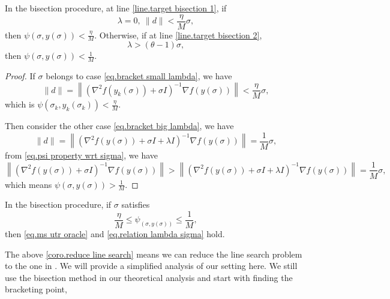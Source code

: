 \documentclass{article}
\begin{document}
\begin{lemma}
    \label{lem.reduce line search}
    In the bisection procedure, at line \ref{line.target bisection 1}, if  
    \begin{equation}
    \label{eq.bracket small lambda}
    \lambda = 0, \ \|d\|<\frac{\eta}{M}\sigma,
    \end{equation}
then $\psi(\sigma,y(\sigma))<\frac{\eta}{M}$.  Otherwise, if at line \ref{line.target bisection 2},
\begin{equation}
    \label{eq.bracket big lambda}
    \lambda > (\theta-1)\sigma,
\end{equation}
then $\psi(\sigma,y(\sigma))<\frac{1}{M}.$
\end{lemma}
\begin{proof}
If $\sigma$ belongs to case \eqref{eq.bracket small lambda}, we have 
\begin{equation*}
    \|d\| = \left \|\left(\nabla^2 f(y_k(\sigma))+\sigma I\right)^{-1}\nabla f(y(\sigma))\right\|<\frac{\eta}{M}\sigma,
\end{equation*}
which is $\psi(\sigma_k,y_k(\sigma_k))<\frac{\eta}{M}$.

Then consider the other case \eqref{eq.bracket big lambda}, we have
\begin{equation*}
    \|d\| = \left \|\left(\nabla^2 f(y(\sigma))+\sigma I+\lambda I\right)^{-1}\nabla f(y(\sigma))\right\|=\frac{1}{M}\sigma,
\end{equation*}
from \eqref{eq.psi property wrt sigma}, we have 
\begin{equation*}
     \left \|\left(\nabla^2 f(y(\sigma))+\sigma I\right)^{-1}\nabla f(y(\sigma))\right\|>\left \|\left(\nabla^2 f(y(\sigma))+\sigma I+\lambda I\right)^{-1}\nabla f(y(\sigma))\right\|=\frac{1}{M}\sigma,
\end{equation*}
which means $\psi \left(\sigma,y(\sigma)\right)>\frac{1}{M}$.
\end{proof}
\begin{corollary}
    \label{coro.reduce line search}
    In the bisection procedure, if $\sigma$ satisfies
    \begin{equation}
        \label{eq.reduce line search interval}
        \frac{\eta}{M}\leq \psi_(\sigma,y(\sigma)) \leq \frac{1}{M},
    \end{equation}
    then \eqref{eq.ms utr oracle} and \eqref{eq.relation lambda sigma} hold.
\end{corollary}
The above \autoref{coro.reduce line search} means we can reduce the line search problem to the one in \citet{monteiro2013accelerated}. We will provide a simplified analysis of our setting here. We still use the bisection method in our theoretical analysis and start with finding the bracketing point,
\end{document}
